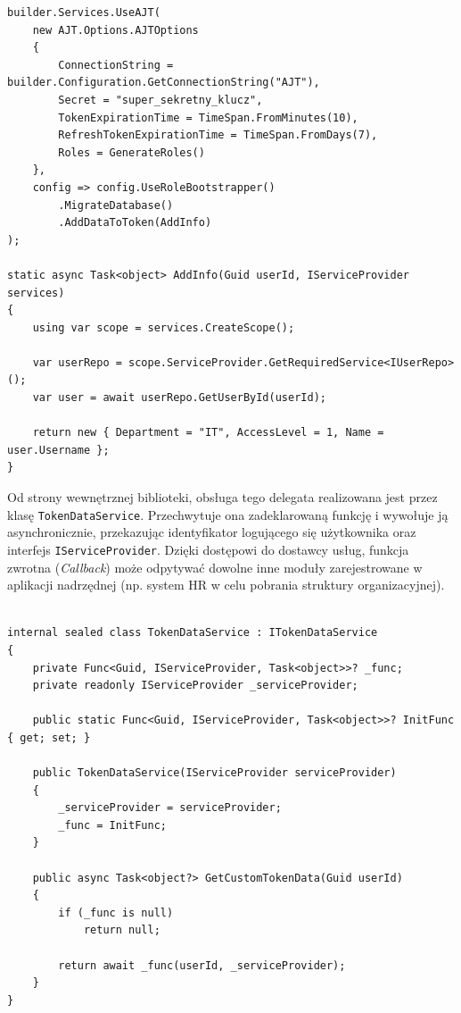 \documentclass{SGGW-thesis}
\begin{document}
\vspace{2cm}

\begin{minipage}{\textwidth}
\begin{lstlisting}    
builder.Services.UseAJT(
    new AJT.Options.AJTOptions
    {
        ConnectionString = builder.Configuration.GetConnectionString("AJT"),
        Secret = "super_sekretny_klucz",
        TokenExpirationTime = TimeSpan.FromMinutes(10),
        RefreshTokenExpirationTime = TimeSpan.FromDays(7),
        Roles = GenerateRoles()
    },
    config => config.UseRoleBootstrapper()
        .MigrateDatabase()
        .AddDataToToken(AddInfo)
);

static async Task<object> AddInfo(Guid userId, IServiceProvider services)
{
    using var scope = services.CreateScope();

    var userRepo = scope.ServiceProvider.GetRequiredService<IUserRepo>();
    var user = await userRepo.GetUserById(userId);

    return new { Department = "IT", AccessLevel = 1, Name = user.Username };
}
\end{lstlisting}
\end{minipage}

\clearpage

Od strony wewnętrznej biblioteki, obsługa tego delegata realizowana jest przez klasę \texttt{TokenDataService}. Przechwytuje ona zadeklarowaną funkcję i wywołuje ją asynchronicznie, przekazując identyfikator logującego się użytkownika oraz interfejs \texttt{IServiceProvider}. Dzięki dostępowi do dostawcy usług, funkcja zwrotna (\textit{Callback}) może odpytywać dowolne inne moduły zarejestrowane w aplikacji nadrzędnej (np. system HR w celu pobrania struktury organizacyjnej).

\vspace{2cm}

\begin{minipage}{\textwidth}
\begin{lstlisting}
    
internal sealed class TokenDataService : ITokenDataService
{
    private Func<Guid, IServiceProvider, Task<object>>? _func;
    private readonly IServiceProvider _serviceProvider;

    public static Func<Guid, IServiceProvider, Task<object>>? InitFunc { get; set; }

    public TokenDataService(IServiceProvider serviceProvider)
    {
        _serviceProvider = serviceProvider;
        _func = InitFunc;
    }

    public async Task<object?> GetCustomTokenData(Guid userId)
    {
        if (_func is null)
            return null;

        return await _func(userId, _serviceProvider);
    }
}
\end{lstlisting}
\end{minipage}
\end{document}

